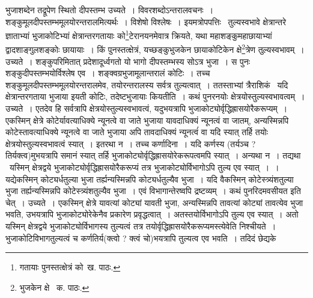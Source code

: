 \documentclass[11pt, openany]{book}
\begin{document}
\noindent भुजाशब्देन तद्रूपेण स्थितो दीपस्तम्भ उच्यते~। विवरशब्दोऽन्तरालवचनः~। शङ्कुमूलदीपस्तम्भमूलयोरन्तरालमित्यर्थः~। विशेषो विश्लेषः~। इयमत्रोपपत्तिः \textendash\ तुल्यस्वभावे क्षेत्रान्तरे ज्ञाताभ्यां भुजाकोटिभ्यां क्षेत्रान्तरगतायाः को\renewcommand{\thefootnote}{१}\footnote{गतायाः पुनस्तत्क्षेत्रं को\textendash\ ख. पाठः.}टेरानयनमेवात्र क्रियते, यथा महाशङ्कुमहाछायाभ्यां द्वादशाङ्गुलशङ्कोः छायायाः~। किं पुनस्तत्क्षेत्रं, यच्छङ्कुभुजकेन छायाकोटिकेन क्षे\renewcommand{\thefootnote}{२}\footnote{भुजकेन क्षे \textendash\ क. पाठः.}त्रेण तुल्यस्वभावम्~। उच्यते~। शङ्कुपरिमितात् प्रदेशादूर्ध्वगतो यो भागो दीपस्तम्भस्य सोऽत्र भुजा~। स पुनः शङ्कुदीपस्तम्भयोर्विश्लेष एव~। शङ्क्वग्रभुजामूलान्तरालं कोटिः~। तच्च शङ्कुमूलदीपस्तम्भमूलयोरन्तरालमेव, तयोरन्तरालस्य सर्वत्र तुल्यत्वात्~। ततस्ताभ्यां त्रैराशिकं \textendash\ यदि क्षेत्रान्तरगताया
भुजाया इयती कोटिः, तदेष्टभुजायाः कियतीति~। कथं पुनरनयोः क्षेत्रयोस्तुल्यस्वभावत्वम्~। उच्यते~। एतदेव हि सर्वत्रापि
क्षेत्रयोस्तुल्यस्वभावत्वं, यदुभयत्रापि भुजाकोट्योर्वृद्धिह्रासयोरैकरूप्यम्~। एकस्मिन् क्षेत्रे कोटेर्यावत्याधिक्ये न्यूनत्वे वा जाते भुजाया यावदाधिक्यं न्यूनत्वं वा जातम्, अन्यस्मिन्नपि कोटेस्तावत्याधिक्ये न्यूनत्वे वा जाते भुजाया अपि तावदाधिक्यं न्यूनत्वंं वा यदि स्यात् तर्हि तयोः क्षेत्रयोस्तुल्यस्वभावत्वं स्यात्~। इतरथा न~। तच्च कर्णादिना~। यदि कर्णस्य (तर्यञ्च ? तिर्यक्त्व)मुभयत्रापि समानं स्यात् तर्हि भुजाकोट्योर्वृद्धिह्रासयोरेकरूपत्वमपि स्यात्~। अन्यथा न~। तद्यथा \textendash\ यस्मिन् क्षेत्रद्वये भुजाकोट्योर्वृद्धिह्रासयोरैकरूप्यं तत्र भुजाकोट्योर्विभागोऽपि तुल्य एव स्यात्~।~। यद्येकस्मिन् कोट्यर्धतुल्या भुजा तर्ह्यन्यस्मिन्नपि कोट्यर्धतुल्यैव भुजा~। यदि वैकस्मिन् कोटेस्त्र्यंशतुल्या भुजा तर्ह्यन्यस्मिन्नपि कोटेस्त्र्यंशतुल्यैव भुजा~। एवं विभागान्तेरष्वपि द्रष्टव्यम्~। कथं पुनरिदमवसीयत इति चेत्~। उच्यते~। एकस्मिन् क्षेत्रे यावत्यां कोट्यां यावती भुजा, अन्यस्मिन्नपि तावत्यां कोट्यां तावत्येव भुजा भवति, उभयत्रापि भुजाकोट्योरेकेनैव प्रकारेण प्रवृद्धत्वात्~। अतस्तयोर्विभागोऽपि तुल्य एव स्यात्~। अतो यस्मिन् क्षेत्रद्वये भुजाकोट्योर्विभागस्य तुल्यत्वं तत्र तयोर्वृद्धिह्रासयोरैकरूप्यमस्त्येवेति निश्चीयते~। भुजाकोटिविभागतुल्यत्वं च कर्णतिर्य(क्त्वो ? क्त्वं चो)भयत्रापि तुल्यत्व एव भवति~। तदिदं छेद्यके

\newpage
\end{document}
